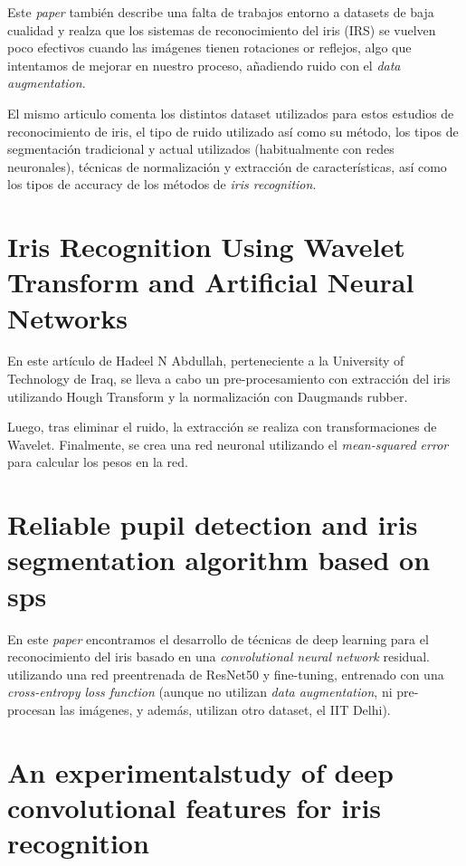  Este \textit{paper} también describe una falta de
 trabajos entorno a datasets de baja cualidad y realza que los sistemas de reconocimiento del iris (IRS) se vuelven 
 poco efectivos cuando las imágenes tienen rotaciones or reflejos, algo que intentamos de mejorar en nuestro proceso, añadiendo ruido con el \textit{data augmentation}.

 El mismo articulo comenta los distintos dataset utilizados para estos estudios de reconocimiento de iris, el tipo de ruido utilizado así como su método,
 los tipos de segmentación tradicional y actual utilizados (habitualmente con redes neuronales), técnicas de normalización y extracción de características, así 
 como los tipos de accuracy de los métodos de \textit{iris recognition}.

\section{Iris Recognition Using Wavelet Transform and Artificial Neural Networks}

En este artículo de Hadeel N Abdullah\cite{abdullah_iris_2015}, perteneciente a la University of Technology de Iraq, se lleva a cabo un pre-procesamiento con extracción del iris utilizando Hough Transform y la 
normalización con Daugmands rubber. 

Luego, tras eliminar el ruido, la extracción se realiza con transformaciones de Wavelet. Finalmente, se crea una red neuronal
utilizando el \textit{mean-squared error} para calcular los pesos en la red.

\section{Reliable pupil detection and iris segmentation algorithm based on sps}

En este \textit{paper}\cite{minaee_deepiris_2019} encontramos el desarrollo de técnicas de deep learning para el reconocimiento del iris basado en una \textit{convolutional neural network} residual. utilizando una red preentrenada 
de ResNet50 y fine-tuning, entrenado con una \textit{cross-entropy loss function} (aunque no utilizan \textit{data augmentation}, ni pre-procesan las imágenes, y además, utilizan otro dataset, el IIT Delhi). 

\section{ An experimentalstudy of deep convolutional features for iris recognition}

